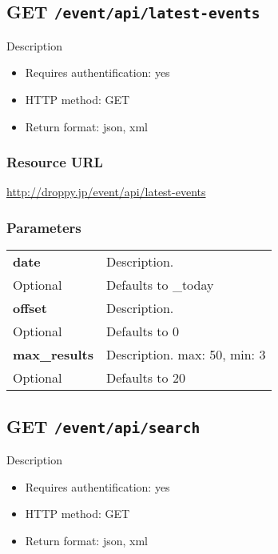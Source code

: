 \documentclass[11pt,a4paper]{article}
\newcommand{\content}[1]{\begin{minipage}{10cm}\vspace{2mm}#1\vspace{2mm}\end{minipage}}
\begin{document}
      
  \subsection*{GET {\tt /event/api/latest-events}}
  Description
  \begin{itemize}
  \item Requires authentification: yes
  \item HTTP method: GET
  \item Return format: json, xml
  \end{itemize}
  \subsubsection*{Resource URL}
  \url{http://droppy.jp/event/api/latest-events}
  \subsubsection*{Parameters}
  \begin{table}[h]
    \begin{center}
      \begin{tabular}{l l}
        \hline 
      \textbf{date} & \content{Description. }
      \\
      Optional & Defaults to \_today\\
      \hline
      \textbf{offset} & \content{Description. }
      \\
      Optional & Defaults to 0\\
      \hline
      \textbf{max\_results} & \content{Description. max: 50, min: 3}
      \\
      Optional & Defaults to 20\\
      \hline
      \end{tabular}
    \end{center}
  \end{table}
  
      \newpage
      
      
  \subsection*{GET {\tt /event/api/search}}
  Description
  \begin{itemize}
  \item Requires authentification: yes
  \item HTTP method: GET
  \item Return format: json, xml
  \end{itemize}
\end{document}
